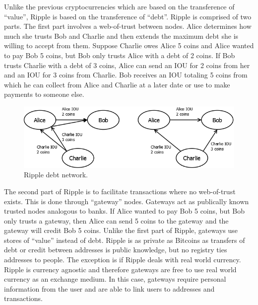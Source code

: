 Unlike the previous cryptocurrencies which are based on the transference of “value”, Ripple is based on the transference of “debt”. Ripple is comprised of two parts. The first part involves a web-of-trust between nodes. Alice determines how much she trusts Bob and Charlie and then extends the maximum debt she is willing to accept from them. Suppose Charlie owes Alice 5 coins and Alice wanted to pay Bob 5 coins, but Bob only trusts Alice with a debt of 2 coins. If Bob trusts Charlie with a debt of 3 coins, Alice can send an IOU for 2 coins from her and an IOU for 3 coins from Charlie. Bob receives an IOU totaling 5 coins from which he can collect from Alice and Charlie at a later date or use to make payments to someone else.

\begin{figure}[ht]
\begin{center}
\includegraphics[scale=0.40]{images/ripple.png}
\caption{Ripple debt network.}
\label{fig:tor-end-to-end}
\end{center}
\end{figure}

The second part of Ripple is to facilitate transactions where no web-of-trust exists. This is done through “gateway” nodes. Gateways act as publically known trusted nodes analogous to banks. If Alice wanted to pay Bob 5 coins, but Bob only trusts a gateway, then Alice can send 5 coins to the gateway and the gateway will credit Bob 5 coins. Unlike the first part of Ripple, gateways use stores of “value” instead of debt. Ripple is as private as Bitcoins as transfers of debt or credit between addresses is public knowledge, but no registry ties addresses to people. The exception is if Ripple deals with real world currency. Ripple is currency agnostic and therefore gateways are free to use real world currency as an exchange medium. In this case, gateways require personal information from the user and are able to link users to addresses and transactions.

